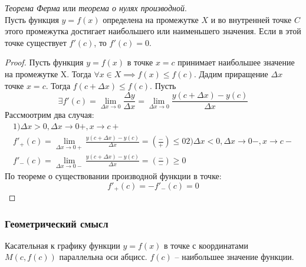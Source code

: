 \begin{theorem}
  \textit{Теорема Ферма} или \textit{теорема о нулях производной}. \\
  Пусть функция $y = f(x)$ определена на промежутке $X$ и во внутренней точке $C$ этого промежутка достигает наибольшего или наименьшего значения. Если в этой точке существует $f'(c)$, то $f'(c) = 0$.
\end{theorem}
\begin{proof}
  Пусть функция $y = f(x)$ в точке  $x = c$ принимает наибольшее значение на промежутке X. Тогда $\forall x \in X \implies f(x) \le f(c)$. Дадим приращение $\Delta x$ точке $x = c$. Тогда $f(c + \Delta x) \le f(c)$. Пусть \[
    \exists f'(c) = \lim_{\Delta x \to 0} \frac{\Delta y}{\Delta x} = \lim_{\Delta x \to 0} \frac{y(c + \Delta x) - y(c)}{\Delta x}
\]
  Рассмоотрим два случая:
  \begin{gather*}
    1) \Delta x > 0, \Delta x \to 0+, x \to c+ \\
      f'_+(c) = \lim_{\Delta x \to 0+} \frac{y(c + \Delta x) - y(c)}{\Delta x} = \left( \frac{-}{+} \right) \le 0
    2) \Delta x < 0, \Delta x \to 0-, x \to c- \\
      f'_-(c) = \lim_{\Delta x \to 0-} \frac{y(c + \Delta x) - y(c)}{\Delta x} = \left( \frac{-}{-} \right) \ge 0
  \end{gather*}
  По теореме о существовании производной функции в точке: \[
  f'_+(c) = -f'_-(c) = 0
  \] 
\end{proof}

\subsubsection*{Геометрический смысл}

Касательная к графику функции $y = f(x)$ в точке с координатами $M(c, f(c))$ параллельна оси абцисс.  $f(c)$ -- наибольшее значение функции.

